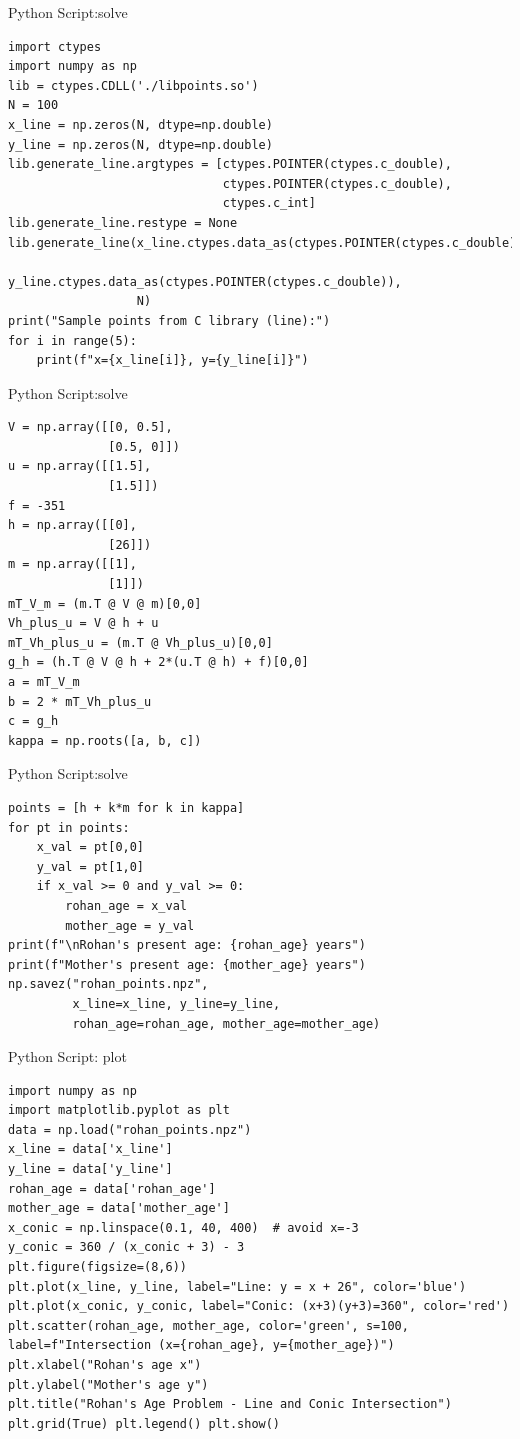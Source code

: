 \documentclass{beamer}
\numberwithin{equation}{section}
\theoremstyle{remark}
\begin{document}
\begin{frame}[fragile]{Python Script:solve }
\begin{verbatim}
import ctypes
import numpy as np
lib = ctypes.CDLL('./libpoints.so')
N = 100
x_line = np.zeros(N, dtype=np.double)
y_line = np.zeros(N, dtype=np.double)
lib.generate_line.argtypes = [ctypes.POINTER(ctypes.c_double),
                              ctypes.POINTER(ctypes.c_double),
                              ctypes.c_int]
lib.generate_line.restype = None
lib.generate_line(x_line.ctypes.data_as(ctypes.POINTER(ctypes.c_double)),
                  y_line.ctypes.data_as(ctypes.POINTER(ctypes.c_double)),
                  N)
print("Sample points from C library (line):")
for i in range(5):
    print(f"x={x_line[i]}, y={y_line[i]}")
    \end{verbatim}
\end{frame}
\begin{frame}[fragile]{Python Script:solve }
\begin{verbatim}
V = np.array([[0, 0.5],
              [0.5, 0]])
u = np.array([[1.5],
              [1.5]])
f = -351
h = np.array([[0],
              [26]])
m = np.array([[1],
              [1]])
mT_V_m = (m.T @ V @ m)[0,0]
Vh_plus_u = V @ h + u
mT_Vh_plus_u = (m.T @ Vh_plus_u)[0,0]
g_h = (h.T @ V @ h + 2*(u.T @ h) + f)[0,0]
a = mT_V_m
b = 2 * mT_Vh_plus_u
c = g_h
kappa = np.roots([a, b, c])
\end{verbatim}
\end{frame}
\begin{frame}[fragile]{Python Script:solve }
\begin{verbatim}
points = [h + k*m for k in kappa]
for pt in points:
    x_val = pt[0,0]
    y_val = pt[1,0]
    if x_val >= 0 and y_val >= 0:
        rohan_age = x_val
        mother_age = y_val
print(f"\nRohan's present age: {rohan_age} years")
print(f"Mother's present age: {mother_age} years")
np.savez("rohan_points.npz",
         x_line=x_line, y_line=y_line,
         rohan_age=rohan_age, mother_age=mother_age)
\end{verbatim}
\end{frame}



\begin{frame}[fragile]{Python Script: plot }
\begin{verbatim}
import numpy as np
import matplotlib.pyplot as plt
data = np.load("rohan_points.npz")
x_line = data['x_line']
y_line = data['y_line']
rohan_age = data['rohan_age']
mother_age = data['mother_age']
x_conic = np.linspace(0.1, 40, 400)  # avoid x=-3
y_conic = 360 / (x_conic + 3) - 3
plt.figure(figsize=(8,6))
plt.plot(x_line, y_line, label="Line: y = x + 26", color='blue')
plt.plot(x_conic, y_conic, label="Conic: (x+3)(y+3)=360", color='red')
plt.scatter(rohan_age, mother_age, color='green', s=100, label=f"Intersection (x={rohan_age}, y={mother_age})")
plt.xlabel("Rohan's age x")
plt.ylabel("Mother's age y")
plt.title("Rohan's Age Problem - Line and Conic Intersection")
plt.grid(True) plt.legend() plt.show()
\end{verbatim}
\end{frame}
\end{document}
